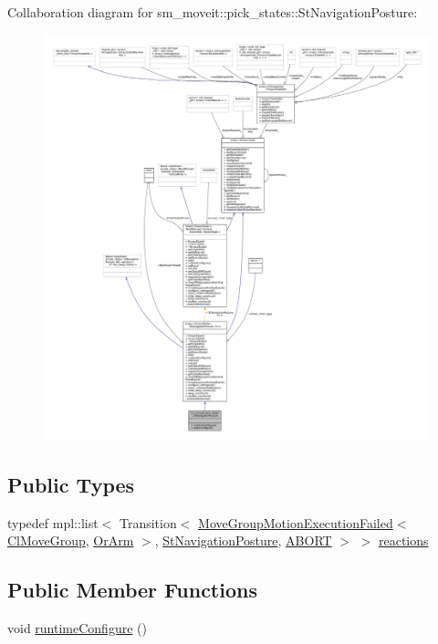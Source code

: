 Collaboration diagram for sm\+\_\+moveit\+:\+:pick\+\_\+states\+:\+:St\+Navigation\+Posture\+:
\nopagebreak
\begin{figure}[H]
\begin{center}
\leavevmode
\includegraphics[width=350pt]{structsm__moveit_1_1pick__states_1_1StNavigationPosture__coll__graph}
\end{center}
\end{figure}
\subsection*{Public Types}
\begin{DoxyCompactItemize}
\item 
typedef mpl\+::list$<$ Transition$<$ \hyperlink{structsm__moveit_1_1cl__movegroup_1_1MoveGroupMotionExecutionFailed}{Move\+Group\+Motion\+Execution\+Failed}$<$ \hyperlink{classsm__moveit_1_1cl__movegroup_1_1ClMoveGroup}{Cl\+Move\+Group}, \hyperlink{classsm__moveit_1_1OrArm}{Or\+Arm} $>$, \hyperlink{structsm__moveit_1_1pick__states_1_1StNavigationPosture}{St\+Navigation\+Posture}, \hyperlink{classABORT}{A\+B\+O\+RT} $>$ $>$ \hyperlink{structsm__moveit_1_1pick__states_1_1StNavigationPosture_a4a54be576d30bc2cb4055730f0fad0c6}{reactions}
\end{DoxyCompactItemize}
\subsection*{Public Member Functions}
\begin{DoxyCompactItemize}
\item 
void \hyperlink{structsm__moveit_1_1pick__states_1_1StNavigationPosture_add5f3d828cb52f6320e5d60fbbf7dec6}{runtime\+Configure} ()
\end{DoxyCompactItemize}
